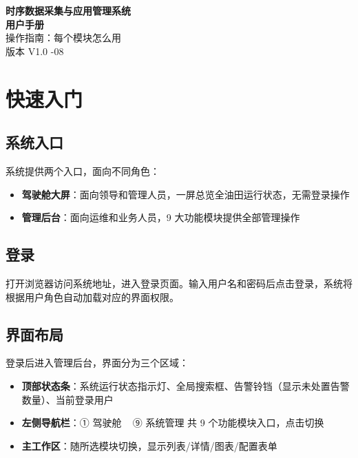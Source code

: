 \documentclass[11pt,a4paper]{ctexart}
\begin{document}
\begin{center}
{\Huge\bfseries 时序数据采集与应用管理系统\\[8pt] 用户手册}\\[14pt]
{\large 操作指南：每个模块怎么用}\\[8pt]
{\large 版本 V1.0 -08}
\end{center}
\vspace{1em}\noindent\hrulefill\vspace{1em}

\section{快速入门}

\subsection{系统入口}

系统提供两个入口，面向不同角色：

\begin{itemize}[leftmargin=*]
  \item \textbf{驾驶舱大屏}：面向领导和管理人员，一屏总览全油田运行状态，无需登录操作
  \item \textbf{管理后台}：面向运维和业务人员，9 大功能模块提供全部管理操作
\end{itemize}

\subsection{登录}

打开浏览器访问系统地址，进入登录页面。输入用户名和密码后点击登录，系统将根据用户角色自动加载对应的界面权限。

\subsection{界面布局}

登录后进入管理后台，界面分为三个区域：

\begin{itemize}[leftmargin=*]
  \item \textbf{顶部状态条}：系统运行状态指示灯、全局搜索框、告警铃铛（显示未处置告警数量）、当前登录用户
  \item \textbf{左侧导航栏}：① 驾驶舱 ~ ⑨ 系统管理 共 9 个功能模块入口，点击切换
  \item \textbf{主工作区}：随所选模块切换，显示列表/详情/图表/配置表单
\end{itemize}
\end{document}
